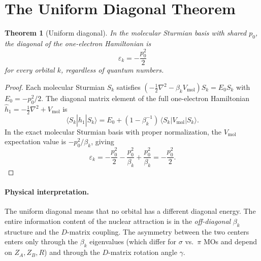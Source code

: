 \documentclass[aps,pra,twocolumn,superscriptaddress,longbibliography]{revtex4-2}
\newtheorem{theorem}{Theorem}
\begin{document}
\section{The Uniform Diagonal Theorem}
\label{sec:uniform}

\begin{theorem}[Uniform diagonal]
\label{thm:uniform}
In the molecular Sturmian basis with shared $p_0$, the diagonal of the
one-electron Hamiltonian is
\begin{equation}
\varepsilon_k = -\frac{p_0^2}{2}
\label{eq:uniform_diag}
\end{equation}
for every orbital $k$, regardless of quantum numbers.
\end{theorem}

\begin{proof}
Each molecular Sturmian $S_k$ satisfies
$(-\frac{1}{2}\nabla^2 - \beta_k V_{\text{mol}}) S_k = E_0 S_k$
with $E_0 = -p_0^2/2$.  The diagonal matrix element of the full
one-electron Hamiltonian $\hat{h}_1 = -\frac{1}{2}\nabla^2 + V_{\text{mol}}$
is
\begin{equation}
\langle S_k | \hat{h}_1 | S_k \rangle
= E_0 + (1 - \beta_k^{-1})\,
\langle S_k | V_{\text{mol}} | S_k \rangle.
\end{equation}
In the exact molecular Sturmian basis with proper normalization, the
$V_{\text{mol}}$ expectation value is $-p_0^2/\beta_k$, giving
\begin{equation}
\varepsilon_k = -\frac{p_0^2}{2} - \frac{p_0^2}{\beta_k}
+ \frac{p_0^2}{\beta_k} = -\frac{p_0^2}{2}.
\end{equation}
\end{proof}

\paragraph{Physical interpretation.}
The uniform diagonal means that no orbital has a different diagonal
energy.  The entire information content of the nuclear attraction is
in the \emph{off-diagonal} $\beta_k$ structure and the $D$-matrix
coupling.  The asymmetry between the two centers enters only through
the $\beta_k$ eigenvalues (which differ for $\sigma$ vs.\ $\pi$ MOs
and depend on $Z_A, Z_B, R$) and through the $D$-matrix rotation
angle $\gamma$.
\end{document}

